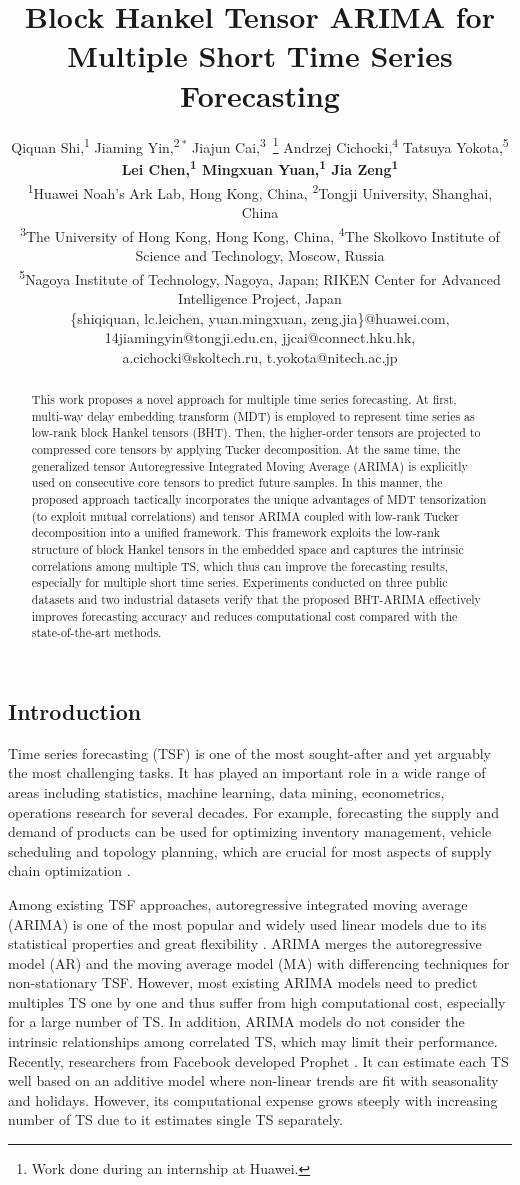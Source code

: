 \documentclass[letterpaper]{article} %
\title{Block Hankel Tensor ARIMA for Multiple Short Time Series Forecasting}
\author{
	Qiquan Shi,\textsuperscript{\rm 1}
	 Jiaming Yin,\textsuperscript{\rm 2}${}^{\ *}$
Jiajun  Cai,\textsuperscript{\rm 3}~\thanks{Work done during an internship at Huawei.} 
	Andrzej Cichocki,\textsuperscript{\rm 4}
Tatsuya Yokota,\textsuperscript{\rm 5}\\\Large\textbf{
Lei Chen,\textsuperscript{\rm 1}
Mingxuan Yuan,\textsuperscript{\rm 1}
Jia Zeng\textsuperscript{\rm 1}}
\\
	\textsuperscript{\rm 1}Huawei Noah's Ark Lab, Hong Kong, China,
	\textsuperscript{\rm 2}Tongji University, Shanghai, China\\
\textsuperscript{\rm 3}The University of Hong Kong, Hong Kong, China, 
\textsuperscript{\rm 4}The Skolkovo  Institute  of Science and Technology, Moscow, Russia\\ 
\textsuperscript{\rm 5}Nagoya Institute of Technology, Nagoya, Japan; RIKEN Center for Advanced Intelligence Project, Japan\\      
\{shiqiquan, lc.leichen, yuan.mingxuan, zeng.jia\}@huawei.com,
14jiamingyin@tongji.edu.cn,  
jjcai@connect.hku.hk,\\
a.cichocki@skoltech.ru, 
t.yokota@nitech.ac.jp
}
\numberwithin{theorem}{section}
\begin{document}
\maketitle

\begin{abstract}
This work proposes a novel approach for multiple time series forecasting. At first, multi-way delay embedding transform (MDT)  is employed to represent time series as low-rank block Hankel tensors (BHT). Then,  the higher-order tensors are projected to compressed core tensors by applying  Tucker decomposition. At the same time, the  generalized tensor Autoregressive Integrated Moving Average (ARIMA) is explicitly used on consecutive core tensors to predict future samples.  In this manner, the proposed approach tactically incorporates the unique advantages of MDT tensorization (to exploit mutual correlations) and tensor ARIMA coupled with low-rank Tucker decomposition into a unified framework.  This framework exploits the  low-rank structure of block Hankel tensors in the embedded space and captures the intrinsic correlations among multiple TS, which thus can improve the forecasting results, especially for multiple short time series.  Experiments conducted on three public  datasets and two industrial datasets verify that the proposed BHT-ARIMA effectively improves forecasting accuracy and reduces computational cost compared with the state-of-the-art methods.  


\end{abstract}


\subsection{Introduction}
Time series forecasting (TSF)  is one of the most sought-after and yet arguably the most challenging tasks. 	It  has played an important  role in a wide range of areas including statistics, machine learning, data mining,  econometrics, operations research for several decades. 
	For example, forecasting the supply and demand of products can be used for  optimizing inventory management, vehicle scheduling and topology planning, which are    crucial for most aspects of supply chain optimization \cite{faloutsos2019forecasting}.
	
	Among existing TSF approaches, autoregressive integrated moving average (ARIMA) \cite{box1968some} is one of the most popular and widely used  linear  models due to its  statistical properties and great flexibility \cite{liu2016online}.  ARIMA  merges       the autoregressive model (AR) and the moving average model (MA)   with  differencing techniques for non-stationary TSF.   However, most existing ARIMA models need to predict multiples TS one by one and thus suffer from high computational cost, especially for a large number of TS.  In addition,   ARIMA models  do not consider  the intrinsic relationships among   correlated TS, which may limit their performance.  Recently, researchers from
	Facebook developed   Prophet \cite{taylor2018forecasting}.  It  can   estimate  each  TS  well based on an additive model where non-linear trends are fit with seasonality and holidays. 
	However, its computational expense grows steeply with increasing number of TS due to it estimates  single TS separately. 
	
\end{document}
